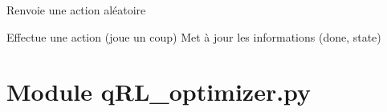 \documentclass[letterpaper,10pt,french]{sphinxmanual}
\begin{document}
\begin{fulllineitems}

\begin{fulllineitems}
\label{\detokenize{index:tetris_RLenv.TetrisEnv.sampleAction}}
Renvoie une action aléatoire

\end{fulllineitems}


\begin{fulllineitems}
\label{\detokenize{index:tetris_RLenv.TetrisEnv.step}}
Effectue une action (joue un coup)
Met à jour les informations (done, state)

\end{fulllineitems}


\end{fulllineitems}


\begin{fulllineitems}
\label{\detokenize{index:tetris_RLenv.getrandbits}}
\end{fulllineitems}


\begin{fulllineitems}
\label{\detokenize{index:tetris_RLenv.random}}\pysiglinewithargsret{\sphinxcode{tetris\_RLenv.}\sphinxbfcode{random}}{}{{ $\rightarrow$ x in the interval {[}0, 1).}}
\end{fulllineitems}



\section{Module qRL\_optimizer.py}
\label{\detokenize{index:module-qrl-optimizer-py}}\label{\detokenize{index:module-qRL_optimizer}}
\end{document}
